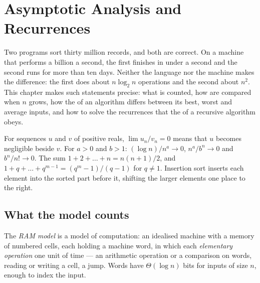 \chapter{Asymptotic Analysis and Recurrences}\label{ch:b1:asymptotic-analysis}

Two programs sort thirty million records, and both are correct. On a machine that performs a billion  a second, the first finishes in under a second and the second runs for more than ten days. Neither the
language nor the machine makes the difference: the first does about $n \log_2 n$ operations and the second about
$n^2$. This chapter makes such statements precise: what is counted, how  are compared when $n$ grows, how the
 of an algorithm differs between its best, worst and average inputs, and how to solve the recurrences that the
 of a recursive algorithm obeys.

\begin{recall}
For sequences $u$ and $v$ of positive reals, $\lim u_n/v_n = 0$ means that $u$ becomes negligible beside $v$. For
$a > 0$ and $b > 1$: $(\log n)/n^a \to 0$, $n^a/b^n \to 0$ and $b^n/n! \to 0$. The sum $1 + 2 + \dots + n = n(n + 1)/2$,
and $1 + q + \dots + q^{m - 1} = (q^m - 1)/(q - 1)$ for $q \neq 1$. Insertion sort inserts each element into the sorted
part before it, shifting the larger elements one place to the right.
\end{recall}

\section{What the model counts}\label{sec:b1:asymptotic-analysis:model}

\begin{definition}\label{def:b1:asymptotic-analysis:ram}
The \emph{RAM model} is a model of computation: an idealised machine with a memory of numbered
cells, each holding a machine word, in which each \emph{elementary operation}  one
unit of time --- an arithmetic operation or a comparison on words, reading or writing a cell, a jump. Words have
$\Theta(\log n)$ bits for inputs of size $n$, enough to index the input.
\end{definition}

